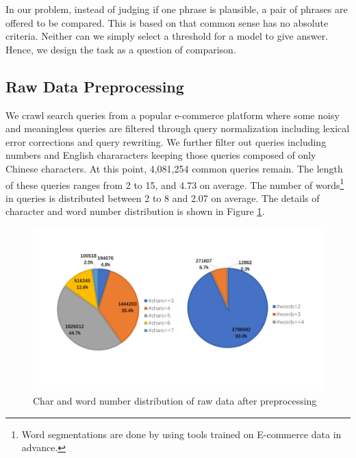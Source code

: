 In our problem, instead of judging if one phrase is plausible, a pair of phrases are offered to be compared. This is based on that common sense has no absolute criteria. 
Neither can we simply select a threshold for a model to give answer. Hence, we design 
the task as a question of comparison.

\subsection{Raw Data Preprocessing}
We crawl search queries from a popular e-commerce platform 
where some noisy and meaningless queries are filtered
through query normalization including lexical error corrections and query rewriting.
We further filter out queries including numbers and English chararacters keeping
those queries composed of only Chinese characters. 
At this point, 4,081,254 common queries remain. 
The length of these queries ranges from 2 to 15, and 4.73 on average. 
The number of words\footnote{Word segmentations are done by using tools trained 
on E-commerce data in advance.} in queries is distributed between 2 to 8 and 2.07 
on average.
The details of character and word number distribution is shown in Figure \ref{fig:wordDist}. 


\begin{figure}
	\centering
	\includegraphics[width=0.95\columnwidth]{images/distributionWords.pdf}
	\caption{Char and word number distribution of raw data after preprocessing}
	\label{fig:wordDist}
\end{figure}

